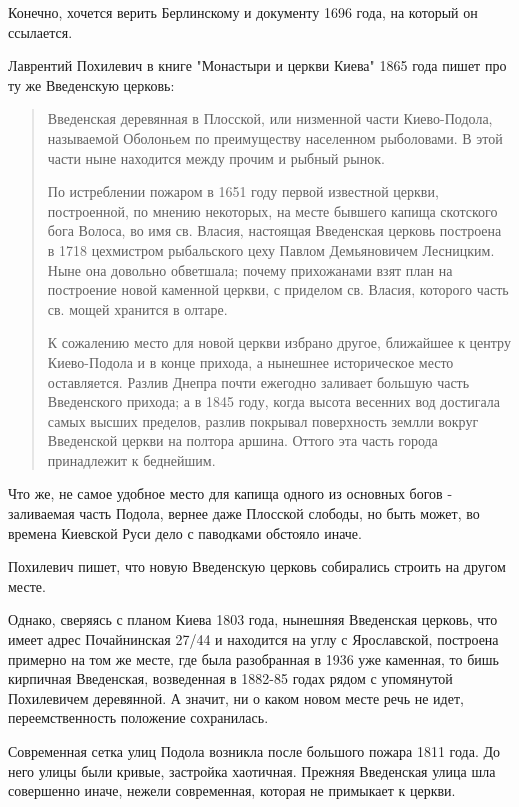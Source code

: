 \documentclass[a5paper,11pt,openany]{article}
\begin{document}
   Конечно, хочется верить Берлинскому и документу 1696 года, на который он ссылается.  

  Лаврентий Похилевич в книге "Монастыри и церкви Киева" 1865 года пишет про ту же Введенскую церковь:

\begin{quotation}
Введенская деревянная в Плосской, или низменной части Киево-Подола, называемой Оболоньем по преимуществу населенном рыболовами. В этой части ныне находится между прочим и рыбный рынок.

По истреблении пожаром в 1651 году первой известной церкви, построенной, по мнению некоторых, на месте бывшего капища скотского бога Волоса, во имя св. Власия, настоящая Введенская церковь построена в 1718 цехмистром рыбальского цеху Павлом Демьяновичем Лесницким. Ныне она довольно обветшала; почему прихожанами взят план на построение новой каменной церкви, с приделом св. Власия, которого часть св. мощей хранится в олтаре.

К сожалению место для новой церкви избрано другое, ближайшее к центру Киево-Подола и в конце прихода, а нынешнее историческое место оставляется. Разлив Днепра почти ежегодно заливает большую часть Введенского прихода; а в 1845 году, когда высота весенних вод достигала самых высших пределов, разлив покрывал поверхность землли вокруг Введенской церкви на полтора аршина. Оттого эта часть города принадлежит к беднейшим.\end{quotation}

   Что же, не самое удобное место для капища одного из основных богов - заливаемая часть Подола, вернее даже Плосской слободы, но быть может, во времена Киевской Руси дело с паводками обстояло иначе. 

    Похилевич пишет, что новую Введенскую церковь собирались строить на другом месте.

   Однако, сверяясь с планом Киева 1803 года,
нынешняя Введенская церковь, что имеет адрес Почайнинская 27/44 и находится на углу с Ярославской, построена примерно на том же месте, где была разобранная в 1936 уже каменная, то бишь кирпичная Введенская, возведенная в 1882-85 годах рядом с упомянутой Похилевичем деревянной. А значит, ни о каком новом месте речь не идет, 
переемственность положение сохранилась.

   Современная сетка улиц Подола возникла после большого пожара 1811 года. До него улицы были кривые, застройка хаотичная. Прежняя Введенская улица шла совершенно иначе, нежели современная, которая не примыкает к церкви.
\end{document}
